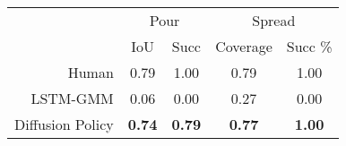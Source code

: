 

\small
\begin{tabular}{r|c|c|c|c}
\toprule
         & \multicolumn{2}{c|}{Pour} & \multicolumn{2}{c}{Spread}    \\
         & IoU & Succ & Coverage & Succ \% \\
\midrule
Human  & 0.79 &     1.00  & 0.79  &    1.00      \\
\midrule
LSTM-GMM & 0.06 & 0.00  &  0.27  & 0.00           \\
Diffusion Policy  &  \textbf{0.74} &\textbf{0.79}   & \textbf{0.77}  & \textbf{1.00}   \\
\bottomrule
\end{tabular}


